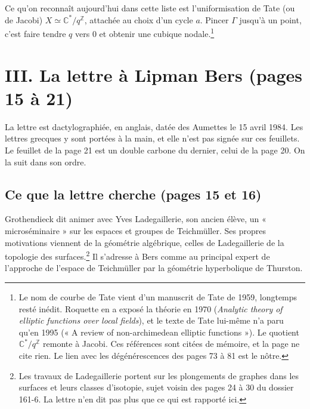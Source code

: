 \documentclass[11pt,a4paper]{article}
\begin{document}
Ce qu'on reconnaît aujourd'hui dans cette liste est l'uniformisation de Tate
(ou de Jacobi) $X \simeq \mathbb{C}^{*}/q^{\mathbb{Z}}$, attachée au choix
d'un cycle $a$. Pincer $\Gamma$ jusqu'à un point, c'est faire tendre $q$ vers
$0$ et obtenir une cubique nodale.\footnote{Le nom de courbe de Tate vient
d'un manuscrit de Tate de 1959, longtemps resté inédit. Roquette en a exposé
la théorie en 1970 (\emph{Analytic theory of elliptic functions over local
fields}), et le texte de Tate lui-même n'a paru qu'en 1995 (« A review of
non-archimedean elliptic functions »). Le quotient
$\mathbb{C}^{*}/q^{\mathbb{Z}}$ remonte à Jacobi. Ces références sont citées
de mémoire, et la page ne cite rien. Le lien avec les dégénérescences des pages 73 à 81 est le nôtre.}

\section*{III. La lettre à Lipman Bers (pages 15 à 21)}

La lettre est dactylographiée, en anglais, datée des Aumettes le 15 avril
1984. Les lettres grecques y sont portées à la main, et elle n'est pas signée
sur ces feuillets. Le feuillet de la page 21 est un double carbone du
dernier, celui de la page 20. On la suit dans son ordre.

\subsection*{Ce que la lettre cherche (pages 15 et 16)}

Grothendieck dit animer avec Yves Ladegaillerie, son ancien élève, un
« microséminaire » sur les espaces et groupes de Teichmüller. Ses propres
motivations viennent de la géométrie algébrique, celles de Ladegaillerie de la
topologie des surfaces.\footnote{Les travaux de Ladegaillerie portent sur les
plongements de graphes dans les surfaces et leurs classes d'isotopie, sujet
voisin des pages 24 à 30 du dossier 161-6. La lettre n'en dit pas plus que
ce qui est rapporté ici.} Il s'adresse à Bers comme au principal expert de
l'approche de l'espace de Teichmüller par la géométrie hyperbolique de
Thurston.
\end{document}
